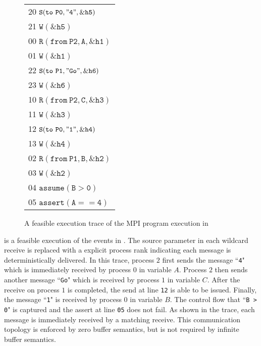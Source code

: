 \begin{figure}[b]
\begin{center}
\setlength{\tabcolsep}{2pt}
\small \begin{tabular}[t]{l}
20 $\mathtt{S(to\ P0, "4", \&h5)}$ \\
21 $\mathtt{W(\&h5)}$\\
\hline
00 $\mathtt{R(from\ P2, A, \&h1)}$ \\
01 $\mathtt{W(\&h1)}$ \\
\hline
22 $\mathtt{S(to\ P1, "Go", \&h6)}$ \\
23 $\mathtt{W(\&h6)}$ \\
\hline
10 $\mathtt{R(from\ P2, C, \&h3)}$ \\
11 $\mathtt{W(\&h3)}$ \\
12 $\mathtt{S(to\ P0, "1", \&h4)}$ \\
13 $\mathtt{W(\&h4)}$ \\
\hline
02 $\mathtt{R(from\ P1, B, \&h2)}$ \\
03 $\mathtt{W(\&h2)}$ \\
04 $\mathtt{assume(B > 0)}$ \\
05 $\mathtt{assert(A == 4)}$ \\
\hline
\end{tabular}
\end{center}
\caption{A feasible execution trace of the MPI program execution in }
\label{fig:trace1}
\end{figure}

 is a feasible execution of the events in . The source parameter in each wildcard receive is replaced with a explicit process rank indicating each message is deterministically delivered. In this trace, process $2$ first sends the message ``\texttt{4}" which is immediately received by process $0$ in variable $A$. Process $2$ then sends another message ``\texttt{Go}" which is received by process $1$ in variable $C$. After the receive on process $1$ is completed, the send at line \texttt{12} is able to be issued. Finally, the message ``\texttt{1}" is received by process $0$ in variable $B$. The control flow that ``\texttt{B > 0}" is captured and the assert at line \texttt{05} does not fail. As shown in the trace, each message is immediately received by a matching receive. This communication topology is enforced by zero buffer semantics, but is not required by infinite buffer semantics.

